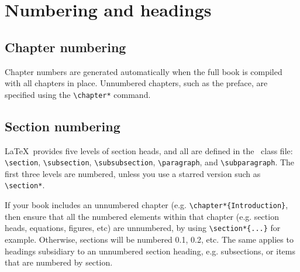 
  \chapter{Numbering and headings}
  \label{chapstructure}


\section{Chapter numbering}
Chapter numbers are generated automatically when the full book
is compiled with all chapters in place. Unnumbered chapters, such as the preface,
are specified using the \verb"\chapter*" command.

\section{Section numbering}

\LaTeX\ provides five levels of section heads, and all are defined
in the \cambridge\ class file: \verb"\section", \verb"\subsection",
 \verb"\subsubsection", \verb"\paragraph", and \verb"\subparagraph".
The first three levels are numbered, unless you use a starred version
such as \verb"\section*".

If your book includes an unnumbered chapter (e.g. \verb"\chapter*{Introduction}",
then ensure that all the numbered elements within that chapter
(e.g. section heads, equations, figures, etc) are unnumbered,
by using \verb"\section*{...}" for example.
Otherwise, sections will be numbered 0.1, 0.2, etc.
The same applies to headings subsidiary to an unnumbered section heading,
e.g. subsections, or items that are numbered by section.

